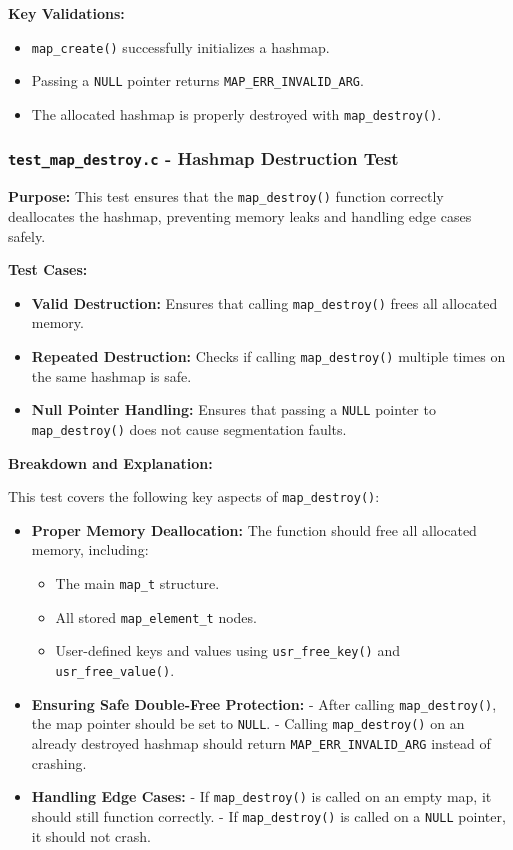 \documentclass[titlepage]{article}
\begin{document}
\textbf{Key Validations:}
\begin{itemize}
    \item \texttt{map\_create()} successfully initializes a hashmap.
    \item Passing a \texttt{NULL} pointer returns \texttt{MAP\_ERR\_INVALID\_ARG}.
    \item The allocated hashmap is properly destroyed with \texttt{map\_destroy()}.
\end{itemize}


\subsubsection{\texttt{test\_map\_destroy.c} - Hashmap Destruction Test}

\textbf{Purpose:}
This test ensures that the \texttt{map\_destroy()} function correctly deallocates the hashmap, preventing memory leaks and handling edge cases safely.

\textbf{Test Cases:}
\begin{itemize}
    \item \textbf{Valid Destruction:} Ensures that calling \texttt{map\_destroy()} frees all allocated memory.
    \item \textbf{Repeated Destruction:} Checks if calling \texttt{map\_destroy()} multiple times on the same hashmap is safe.
    \item \textbf{Null Pointer Handling:} Ensures that passing a \texttt{NULL} pointer to \texttt{map\_destroy()} does not cause segmentation faults.
\end{itemize}

\textbf{Breakdown and Explanation:}

This test covers the following key aspects of \texttt{map\_destroy()}:

\begin{itemize}
    \item \textbf{Proper Memory Deallocation:}
    The function should free all allocated memory, including:
    \begin{itemize}
        \item The main \texttt{map\_t} structure.
        \item All stored \texttt{map\_element\_t} nodes.
        \item User-defined keys and values using \texttt{usr\_free\_key()} and \texttt{usr\_free\_value()}.
    \end{itemize}

    \item \textbf{Ensuring Safe Double-Free Protection:}
    - After calling \texttt{map\_destroy()}, the map pointer should be set to \texttt{NULL}.
    - Calling \texttt{map\_destroy()} on an already destroyed hashmap should return \texttt{MAP\_ERR\_INVALID\_ARG} instead of crashing.

    \item \textbf{Handling Edge Cases:}
    - If \texttt{map\_destroy()} is called on an empty map, it should still function correctly.
    - If \texttt{map\_destroy()} is called on a \texttt{NULL} pointer, it should not crash.
\end{itemize}
\end{document}
